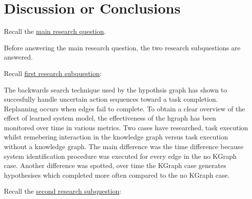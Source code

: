 \chapter{Discussion or Conclusions}


Recall the \hyperref[researchquestion:main]{main research question}. \vspace{0.5\baselineskip}\\
\textit{\indent{}}\vspace{\baselineskip}

\noindent Before answering the main research question, the two research subquestions are answered.\vspace{\baselineskip}

\noindent Recall \hyperref[researchsubquestion:does_it_work]{first research subquestion}:\vspace{0.5\baselineskip}\\
\textit{\indent{}}\vspace{0.5\baselineskip}

\noindent The backwards search technique used by the hypothsis graph has shown to succesfully handle uncertain action sequences toward a task completion. Replanning occurs when edges fail to complete. To obtain a clear overview of the effect of learned system model, the effectiveness of the hgraph has been monitored over time in various metrics. Two cases have researched, task execution whilst remebering interaction in the knowledge graph versus task execution without a knowledge graph. The main difference was the time difference because system identification procedure was executed for every edge in the no KGraph case. Another difference was spotted, over time the KGraph case generates hypothesises which completed more often compared to the no KGraph case. \vspace{\baselineskip}


\noindent Recall the \hyperref[researchsubquestion:does_it_compare]{second research subquestion}:\vspace{0.5\baselineskip}\\
\textit{}\vspace{0.5\baselineskip}

